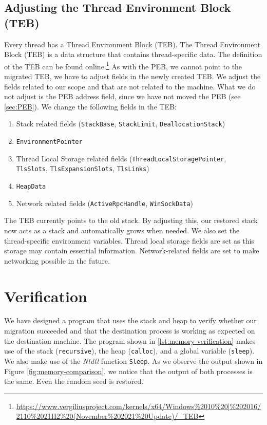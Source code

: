 \documentclass[a4paper, 11pt, english]{report}
\begin{document}

\subsection{Adjusting the Thread Environment Block (TEB)}
\label{sec:TEB}
Every thread has a Thread Environment Block (TEB). The Thread Environment Block (TEB) is a data structure that contains thread-specific data. The definition of the TEB can be found online.\footnote{\url{https://www.vergiliusproject.com/kernels/x64/Windows\%2010\%20|\%202016/2110\%2021H2\%20(November\%202021\%20Update)/\_TEB}}
As with the PEB, we cannot point to the migrated TEB, we have to adjust fields in the newly created TEB.
We adjust the fields related to our scope and that are not related to the machine. What we do not adjust is the PEB address field, since we have not moved the PEB (see \autoref{sec:PEB}).
We change the following fields in the TEB:
\begin{enumerate}
	\item Stack related fields (\texttt{StackBase}, \texttt{StackLimit}, \texttt{DeallocationStack})
	\item \texttt{EnvironmentPointer}
	\item Thread Local Storage related fields (\texttt{ThreadLocalStoragePointer},\\ \texttt{TlsSlots}, \texttt{TlsExpansionSlots}, \texttt{TlsLinks})
	\item \texttt{HeapData} 
	\item Network related fields (\texttt{ActiveRpcHandle}, \texttt{WinSockData})
\end{enumerate}

The TEB currently points to the old stack. By adjusting this, our restored stack now acts as a stack and automatically grows when needed.
We also set the thread-specific environment variables. Thread local storage fields are set as this storage may contain essential information. Network-related fields are set to make networking possible in the future.


\section{Verification}
\label{sec:verification-memory}
We have designed a program that uses the stack and heap to verify whether our migration succeeded and that the destination process is working as expected on the destination machine.
The program shown in \autoref{lst:memory-verification} makes use of the stack (\texttt{recursive}), the heap (\texttt{calloc}), and a global variable (\texttt{sleep}). We also make use of the \textit{Ntdll} function \texttt{Sleep}. As we observe the output shown in Figure \autoref{fig:memory-comparison}, we notice that the output of both processes is the same. Even the random seed is restored.
\end{document}
